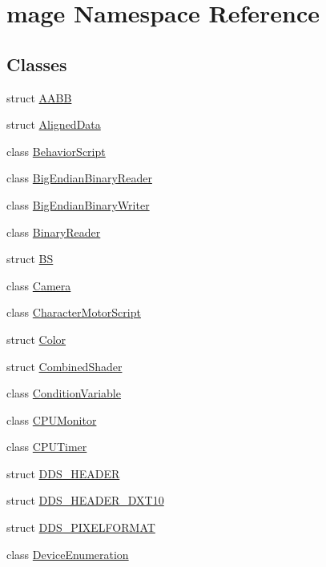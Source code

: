 \hypertarget{namespacemage}{}\section{mage Namespace Reference}
\label{namespacemage}
\subsection*{Classes}
\begin{DoxyCompactItemize}
\item 
struct \hyperlink{structmage_1_1_a_a_b_b}{A\+A\+BB}
\item 
struct \hyperlink{structmage_1_1_aligned_data}{Aligned\+Data}
\item 
class \hyperlink{classmage_1_1_behavior_script}{Behavior\+Script}
\item 
class \hyperlink{classmage_1_1_big_endian_binary_reader}{Big\+Endian\+Binary\+Reader}
\item 
class \hyperlink{classmage_1_1_big_endian_binary_writer}{Big\+Endian\+Binary\+Writer}
\item 
class \hyperlink{classmage_1_1_binary_reader}{Binary\+Reader}
\item 
struct \hyperlink{structmage_1_1_b_s}{BS}
\item 
class \hyperlink{classmage_1_1_camera}{Camera}
\item 
class \hyperlink{classmage_1_1_character_motor_script}{Character\+Motor\+Script}
\item 
struct \hyperlink{structmage_1_1_color}{Color}
\item 
struct \hyperlink{structmage_1_1_combined_shader}{Combined\+Shader}
\item 
class \hyperlink{classmage_1_1_condition_variable}{Condition\+Variable}
\item 
class \hyperlink{classmage_1_1_c_p_u_monitor}{C\+P\+U\+Monitor}
\item 
class \hyperlink{classmage_1_1_c_p_u_timer}{C\+P\+U\+Timer}
\item 
struct \hyperlink{structmage_1_1_d_d_s___h_e_a_d_e_r}{D\+D\+S\+\_\+\+H\+E\+A\+D\+ER}
\item 
struct \hyperlink{structmage_1_1_d_d_s___h_e_a_d_e_r___d_x_t10}{D\+D\+S\+\_\+\+H\+E\+A\+D\+E\+R\+\_\+\+D\+X\+T10}
\item 
struct \hyperlink{structmage_1_1_d_d_s___p_i_x_e_l_f_o_r_m_a_t}{D\+D\+S\+\_\+\+P\+I\+X\+E\+L\+F\+O\+R\+M\+AT}
\item 
class \hyperlink{classmage_1_1_device_enumeration}{Device\+Enumeration}

\end{DoxyCompactItemize}
